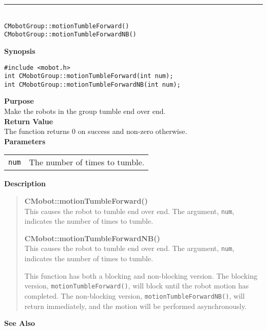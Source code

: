 \noindent
\vspace{5pt}
\rule{4.5in}{0.015in}\\
\noindent
{\LARGE \texttt{CMobotGroup::motionTumbleForward()}}\\
{\LARGE \texttt{CMobotGroup::motionTumbleForwardNB()}}\\
{}

\noindent
{\bf Synopsis}
\vspace{-8pt}
\begin{verbatim}
#include <mobot.h>
int CMobotGroup::motionTumbleForward(int num);
int CMobotGroup::motionTumbleForwardNB(int num);
\end{verbatim}

\noindent
{\bf Purpose}\\
Make the robots in the group tumble end over end.\\

\noindent
{\bf Return Value}\\
The function returns 0 on success and non-zero otherwise.\\

\noindent
{\bf Parameters}\\
\vspace{-0.1in}
\begin{description}
\item               
\begin{tabular}{p{10 mm}p{145 mm}}
\texttt{num} & The number of times to tumble. \\
\end{tabular}
\end{description}

\noindent
{\bf Description}\\
\vspace{-12pt}
\begin{quote}
{\bf CMobot::motionTumbleForward()}\\
This causes the robot to tumble end over end. The argument, \texttt{num},
indicates the number of times to tumble.

{\bf CMobot::motionTumbleForwardNB()}\\
This causes the robot to tumble end over end. The argument, \texttt{num},
indicates the number of times to tumble.

This function has both a blocking and non-blocking version.
The blocking version, \texttt{motionTumbleForward()}, will block until the
robot motion has completed. The non-blocking version, \texttt{motionTumbleForwardNB()},
will return immediately, and the motion will be performed asynchronously.\\
\end{quote}

\noindent
{\bf See Also}\\

